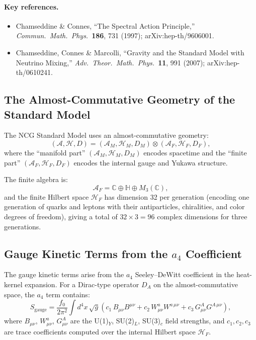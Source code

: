 \documentclass[12pt,a4paper]{article}
\begin{document}
\paragraph{Key references.}
\begin{itemize}
\item Chamseddine \& Connes, ``The Spectral Action Principle,'' \textit{Commun.\
Math.\ Phys.}\ \textbf{186}, 731 (1997); arXiv:hep-th/9606001.
\item Chamseddine, Connes \& Marcolli, ``Gravity and the Standard Model with
Neutrino Mixing,'' \textit{Adv.\ Theor.\ Math.\ Phys.}\ \textbf{11}, 991 (2007);
arXiv:hep-th/0610241.
\end{itemize}

\subsection{The Almost-Commutative Geometry of the Standard Model}

The NCG Standard Model uses an almost-commutative geometry:
\begin{equation}
(\mathcal{A}, \mathcal{H}, D) = (\mathcal{A}_M, \mathcal{H}_M, D_M)
\otimes (\mathcal{A}_F, \mathcal{H}_F, D_F),
\end{equation}
where the ``manifold part'' $(\mathcal{A}_M, \mathcal{H}_M, D_M)$ encodes
spacetime and the ``finite part'' $(\mathcal{A}_F, \mathcal{H}_F, D_F)$
encodes the internal gauge and Yukawa structure.

The finite algebra is:
\begin{equation}
\mathcal{A}_F = \mathbb{C} \oplus \mathbb{H} \oplus M_3(\mathbb{C}),
\end{equation}
and the finite Hilbert space $\mathcal{H}_F$ has dimension 32 per generation
(encoding one generation of quarks and leptons with their antiparticles,
chiralities, and color degrees of freedom), giving a total of $32 \times 3 = 96$
complex dimensions for three generations.

\subsection{Gauge Kinetic Terms from the $a_4$ Coefficient}
\label{sec:ccm-gauge}

The gauge kinetic terms arise from the $a_4$ Seeley--DeWitt coefficient in the
heat-kernel expansion.  For a Dirac-type operator $D_A$ on the
almost-commutative space, the $a_4$ term contains:
\begin{equation}\label{eq:gauge-kinetic-ccm}
S_{\mathrm{gauge}} = \frac{f_0}{2\pi^2}
\int d^4x\,\sqrt{g}\left(
c_1\,B_{\mu\nu}B^{\mu\nu}
+ c_2\,W^a_{\mu\nu}W^{a\,\mu\nu}
+ c_3\,G^A_{\mu\nu}G^{A\,\mu\nu}
\right),
\end{equation}
where $B_{\mu\nu}$, $W^a_{\mu\nu}$, $G^A_{\mu\nu}$ are the U(1)$_Y$, SU(2)$_L$,
SU(3)$_c$ field strengths, and $c_1, c_2, c_3$ are trace coefficients computed
over the internal Hilbert space $\mathcal{H}_F$.
\end{document}

